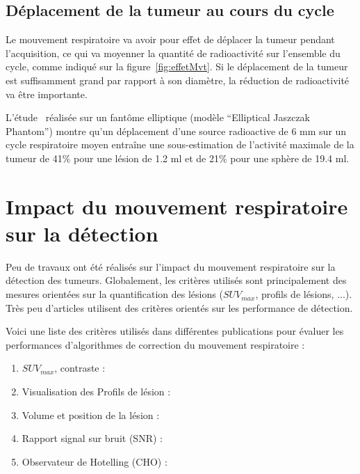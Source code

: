 \subsection{Déplacement de la tumeur au cours du cycle}

Le mouvement respiratoire va avoir pour effet de déplacer la tumeur pendant l'acquisition, ce qui va moyenner la quantité de radioactivité sur l'ensemble du cycle, comme indiqué sur la figure~\ref{fig:effetMvt}. Si le déplacement de la tumeur est suffisamment grand par rapport à son diamètre, la réduction de radioactivité va être importante.

L'étude~\cite{boucher2004respiratory} réalisée sur un fantôme elliptique (modèle ``Elliptical Jaszczak Phantom'') montre qu'un déplacement d'une source radioactive de 6 mm sur un cycle respiratoire moyen entraîne une sous-estimation de l'activité maximale de la tumeur de 41\% pour une lésion de 1.2 ml et de 21\% pour une sphère de 19.4 ml.


\section{Impact du mouvement respiratoire sur la détection}

Peu de travaux ont été réalisés sur l'impact du mouvement respiratoire sur la détection des tumeurs. Globalement, les critères utilisés sont principalement des mesures orientées sur la quantification des lésions ($SUV_{max}$, profils de lésions, ...). Très peu d'articles utilisent des critères orientés sur les performance de détection.

Voici une liste des critères utilisés dans différentes publications pour évaluer les performances d'algorithmes de correction du mouvement respiratoire :

\begin{enumerate}
 \item  $SUV_{max}$, contraste :~\cite{GuopingChang2010Implementation,lamare2007list,nehmeh2002effect,detorie2008quantitative}
 \item Visualisation des Profils de lésion :~\cite{GuopingChang2010Implementation,Thielemans2006Lesion,lamare2007list}
 \item Volume et position de la lésion :~\cite{GuopingChang2010Implementation,lamare2007list,nehmeh2002effect}
 \item Rapport signal sur bruit (SNR) :~\cite{GuopingChang2010Implementation}
 \item Observateur de Hotelling (CHO) :~\cite{Thielemans2006Lesion}
\end{enumerate}

